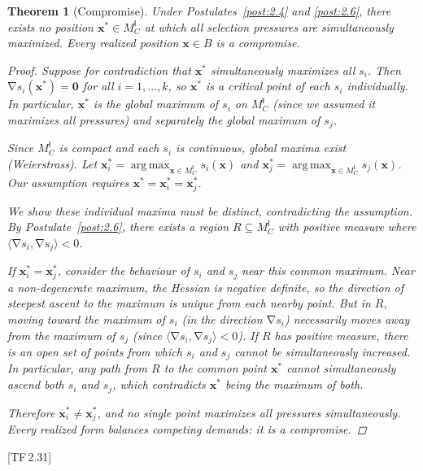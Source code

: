 \documentclass[10pt]{article}
\theoremstyle{definition}
\theoremstyle{plain}
\newtheorem{theorem}[definition]{Theorem}
\theoremstyle{remark}
\newcommand{\MC}{M^{\mathsf{I}}_C}          %
\newcommand{\inner}[2]{\langle #1, #2 \rangle}
\DeclareMathOperator{\grad}{\nabla}
\DeclareMathOperator{\argmax}{arg\,max}
\newcommand{\TF}[1]{\textnormal{[TF\,#1]}}  %
\begin{document}
\begin{theorem}[Compromise]\label{thm:2.7}
Under Postulates~\ref{post:2.4} and \ref{post:2.6}, there exists no
position $\bm{x}^* \in \MC$ at which all selection pressures are
simultaneously maximized. Every realized position $\bm{x} \in B$
is a \emph{compromise}.

\begin{proof}
Suppose for contradiction that $\bm{x}^*$ simultaneously maximizes
all $s_i$. Then $\grad s_i(\bm{x}^*) = \bm{0}$ for all
$i = 1, \ldots, k$, so $\bm{x}^*$ is a critical point of each
$s_i$ individually. In particular, $\bm{x}^*$ is the global
maximum of $s_i$ on $\MC$ (since we assumed it maximizes all pressures)
and separately the global maximum of $s_j$.

Since $\MC$ is compact and each $s_i$ is continuous, global maxima
exist (Weierstrass). Let $\bm{x}_i^* = \argmax_{\bm{x} \in \MC}
s_i(\bm{x})$ and $\bm{x}_j^* = \argmax_{\bm{x} \in \MC}
s_j(\bm{x})$. Our assumption requires
$\bm{x}^* = \bm{x}_i^* = \bm{x}_j^*$.

We show these individual maxima must be distinct, contradicting the
assumption. By Postulate~\ref{post:2.6}, there exists a region
$R \subseteq \MC$ with positive measure where
$\inner{\grad s_i}{\grad s_j} < 0$.

If $\bm{x}_i^* = \bm{x}_j^*$, consider the behaviour of
$s_i$ and $s_j$ near this common maximum. Near a non-degenerate
maximum, the Hessian is negative definite, so the direction of
steepest ascent to the maximum is unique from each nearby point.
But in $R$, moving toward the maximum of $s_i$ (in the direction
$\grad s_i$) necessarily moves away from the maximum of $s_j$
(since $\inner{\grad s_i}{\grad s_j} < 0$). If $R$ has positive
measure, there is an open set of points from which $s_i$ and $s_j$
cannot be simultaneously increased. In particular, any path from
$R$ to the common point $\bm{x}^*$ cannot simultaneously ascend
both $s_i$ and $s_j$, which contradicts $\bm{x}^*$ being the
maximum of both.

Therefore $\bm{x}_i^* \neq \bm{x}_j^*$, and no single point
maximizes all pressures simultaneously. Every realized form
balances competing demands: it is a compromise. \qedhere
\end{proof}
\end{theorem}

\TF{2.31}
\end{document}
